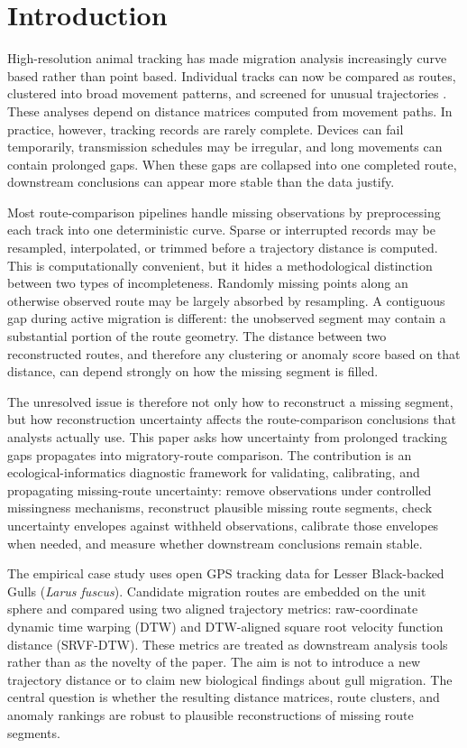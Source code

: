 \section{Introduction}\label{introduction}

High-resolution animal tracking has made migration analysis increasingly curve based rather than point based. Individual tracks can now be compared as routes, clustered into broad movement patterns, and screened for unusual trajectories \citep{kranstauber2011, kays2022}. These analyses depend on distance matrices computed from movement paths. In practice, however, tracking records are rarely complete. Devices can fail temporarily, transmission schedules may be irregular, and long movements can contain prolonged gaps. When these gaps are collapsed into one completed route, downstream conclusions can appear more stable than the data justify.

Most route-comparison pipelines handle missing observations by preprocessing each track into one deterministic curve. Sparse or interrupted records may be resampled, interpolated, or trimmed before a trajectory distance is computed. This is computationally convenient, but it hides a methodological distinction between two types of incompleteness. Randomly missing points along an otherwise observed route may be largely absorbed by resampling. A contiguous gap during active migration is different: the unobserved segment may contain a substantial portion of the route geometry. The distance between two reconstructed routes, and therefore any clustering or anomaly score based on that distance, can depend strongly on how the missing segment is filled.

The unresolved issue is therefore not only how to reconstruct a missing segment, but how reconstruction uncertainty affects the route-comparison conclusions that analysts actually use. This paper asks how uncertainty from prolonged tracking gaps propagates into migratory-route comparison. The contribution is an ecological-informatics diagnostic framework for validating, calibrating, and propagating missing-route uncertainty: remove observations under controlled missingness mechanisms, reconstruct plausible missing route segments, check uncertainty envelopes against withheld observations, calibrate those envelopes when needed, and measure whether downstream conclusions remain stable.

The empirical case study uses open GPS tracking data for Lesser Black-backed Gulls (\emph{Larus fuscus}). Candidate migration routes are embedded on the unit sphere and compared using two aligned trajectory metrics: raw-coordinate dynamic time warping (DTW) and DTW-aligned square root velocity function distance (SRVF-DTW). These metrics are treated as downstream analysis tools rather than as the novelty of the paper. The aim is not to introduce a new trajectory distance or to claim new biological findings about gull migration. The central question is whether the resulting distance matrices, route clusters, and anomaly rankings are robust to plausible reconstructions of missing route segments.

